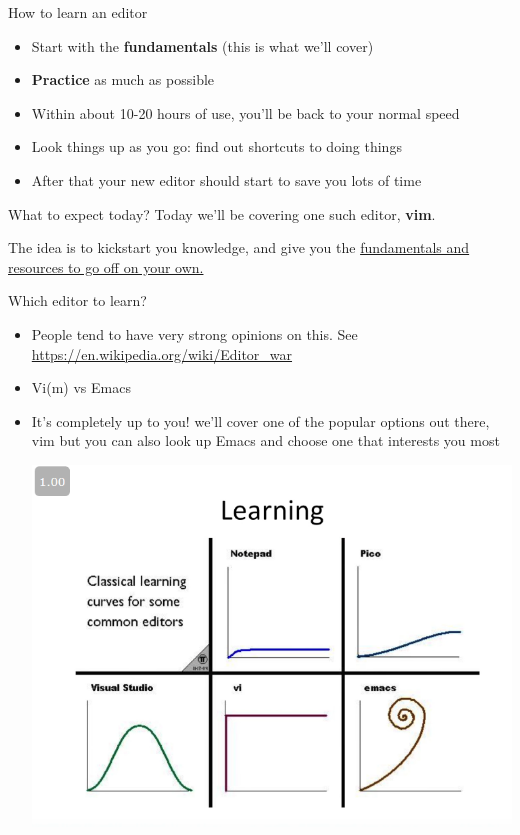 \documentclass[12pt]{beamer}
\begin{document}
\begin{frame}{How to learn an editor}
    \begin{itemize}
        \item Start with the \textbf{fundamentals} (this is what we'll cover)
        \item \textbf{Practice} as much as possible
        \item Within about 10-20 hours of use, you'll be back to your normal speed
        \item Look things up as you go: find out shortcuts to doing things
        \item After that your new editor should start to save you lots of time
    \end{itemize}{}
\end{frame}{}

\begin{frame}{What to expect today?}
        Today we'll be covering one such editor, \textbf{vim}.

        The idea is to kickstart you knowledge, and give you the \underline{fundamentals and resources to go off on your own.}
\end{frame}{}

\begin{frame}{Which editor to learn?}
    \begin{itemize}
        \item People tend to have very strong opinions on this. See \url{https://en.wikipedia.org/wiki/Editor_war}
        \item Vi(m) vs Emacs
        \item It’s completely up to you! we’ll cover one of the popular options out there, vim but you can also look up Emacs and choose one that interests you most

        \begin{center}
            \includegraphics[width=0.5\linewidth]{editor-curve.png} 
        \end{center}{}
    \end{itemize}{}
\end{frame}{}
\end{document}
